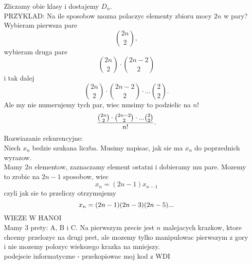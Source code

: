 \documentclass{article}
\begin{document}
    Zliczamy obie klasy i dostajemy $D_n$.\bigskip\\
    \color{emp}PRZYKLAD\color{txt}: Na ile sposobow mozna polaczyc elementy zbioru mocy $2n$ w pary?\smallskip\\
    Wybieram pierwsza pare
    $${2n\choose 2},$$
    wybieram druga pare
    $${2n\choose2}\cdot{2n-2\choose2}$$
    i tak dalej
    $${2n\choose2}\cdot{2n-2\choose2}\cdot...{2\choose2}.$$
    Ale my nie numerujemy tych par, wiec musimy to podzielic na $n!$
    $${{2n\choose2}\cdot{2n-2\choose2}\cdot...{2\choose2}\over n!}.$$
    \color{acc}Rozwiazanie rekurencyjne:\color{txt}\smallskip\\
    Niech $x_n$ bedzie szukana liczba. Musimy napisac, jak sie ma $x_n$ do poprzednich wyrazow.\\
    Mamy $2n$ elementow, zaznaczamy element ostatni i dobieramy mu pare. Mozemy to zrobic na $2n-1$ sposobow, wiec
    $$x_n=(2n-1)x_{n-1}$$
    czyli jak sie to przeliczy otrzymujemy
    $$x_n=(2n-1)(2n-3)(2n-5)...\bigskip$$
    \color{def}WIEZE W HANOI\color{txt}\smallskip\\
    Mamy 3 prety: A, B i C. Na pierwszym precie jest $n$ malejacych krazkow, ktore chcemy przelozyc na drugi pret, ale mozemy tylko manipulowac pierwszym z gory i nie mozemy polozyc wiekszego krazka na mniejszy.\smallskip\\
    podejscie informatyczne - \color{tit}przekopiowac moj kod z WDI\color{txt}
\end{document}
